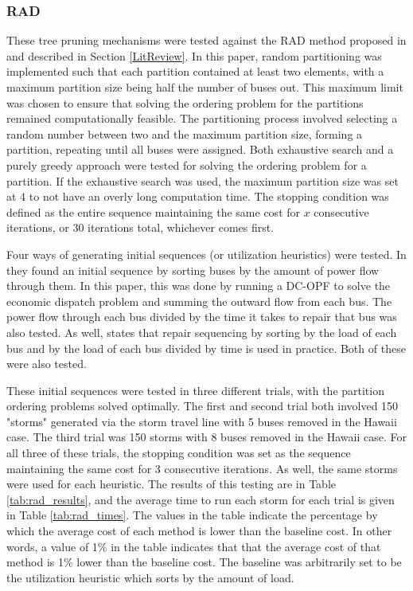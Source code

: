 \documentclass[12pt]{article}
\begin{document}
\subsubsection{RAD}
These tree pruning mechanisms were tested against the RAD method proposed in \cite{coffrin2012} and described in Section \ref{LitReview}. In this paper, random partitioning was implemented such that each partition contained at least two elements, with a maximum partition size being half  the number of buses out. This maximum limit was chosen to ensure that solving the ordering problem for the partitions remained computationally feasible. The partitioning process involved selecting a random number between two and the maximum partition size, forming a partition, repeating until all buses were assigned. Both exhaustive search and a purely greedy approach were tested for solving the ordering problem for a partition. If the exhaustive search was used, the maximum partition size was set at 4 to not have an overly long computation time.  The stopping condition was defined as the entire sequence maintaining the same cost for $x$ consecutive iterations, or 30 iterations total, whichever comes first. \par

Four ways of generating initial sequences (or utilization heuristics) were tested. In \cite{coffrin2012} they found an initial sequence by sorting buses by the amount of power flow through them. In this paper, this was done by running a DC-OPF to solve the economic dispatch problem and summing the outward flow from each bus. The power flow through each bus divided by the time it takes to repair that bus was also tested. As well, \cite{tan} states that repair sequencing by sorting by the load of each bus and by the load of each bus divided by time is used in practice. Both of these were also tested.

These initial sequences were tested in three different trials, with the partition ordering problems solved optimally. The first and second trial both involved 150 "storms" generated via the storm travel line with 5 buses removed in the Hawaii case. The third trial was 150 storms with 8 buses removed in the Hawaii case. For all three of these trials, the stopping condition was set as the sequence maintaining the same cost for 3 consecutive iterations. As well, the same storms were used for each heuristic. The results of this testing are in Table \ref{tab:rad_results}, and the average time to run each storm  for each trial is given in Table \ref{tab:rad_times}. The values in the table indicate the percentage by which the average cost of each method is lower than the baseline cost. In other words, a value of 1\% in the table indicates that that the average cost of that method is 1\% lower than the baseline cost. The baseline  was arbitrarily set to be the utilization heuristic which sorts by the amount of load. 
\end{document}
